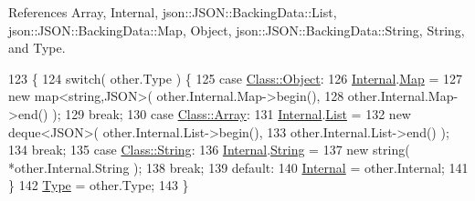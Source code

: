 References Array, Internal, json\+::\+J\+S\+O\+N\+::\+Backing\+Data\+::\+List, json\+::\+J\+S\+O\+N\+::\+Backing\+Data\+::\+Map, Object, json\+::\+J\+S\+O\+N\+::\+Backing\+Data\+::\+String, String, and Type.


\begin{DoxyCode}
123                                   \{
124             \textcolor{keywordflow}{switch}( other.Type ) \{
125             \textcolor{keywordflow}{case} \mbox{\hyperlink{classjson_1_1_j_s_o_n_a762f55df6d407c1af61607ed516ffe07a497031794414a552435f90151ac3b54b}{Class::Object}}:
126                 \mbox{\hyperlink{classjson_1_1_j_s_o_n_a1e2a064794c3d55c8bb8887fc5734947}{Internal}}.\mbox{\hyperlink{unionjson_1_1_j_s_o_n_1_1_backing_data_ab2e19b00745b37d2add157ff3a35c431}{Map}} = 
127                     \textcolor{keyword}{new} map<string,JSON>( other.Internal.Map->begin(),
128                                           other.Internal.Map->end() );
129                 \textcolor{keywordflow}{break};
130             \textcolor{keywordflow}{case} \mbox{\hyperlink{classjson_1_1_j_s_o_n_a762f55df6d407c1af61607ed516ffe07a4410ec34d9e6c1a68100ca0ce033fb17}{Class::Array}}:
131                 \mbox{\hyperlink{classjson_1_1_j_s_o_n_a1e2a064794c3d55c8bb8887fc5734947}{Internal}}.\mbox{\hyperlink{unionjson_1_1_j_s_o_n_1_1_backing_data_ab85f5e7ad21f9f7a5407ab73128a3ebc}{List}} = 
132                     \textcolor{keyword}{new} deque<JSON>( other.Internal.List->begin(),
133                                       other.Internal.List->end() );
134                 \textcolor{keywordflow}{break};
135             \textcolor{keywordflow}{case} \mbox{\hyperlink{classjson_1_1_j_s_o_n_a762f55df6d407c1af61607ed516ffe07a27118326006d3829667a400ad23d5d98}{Class::String}}:
136                 \mbox{\hyperlink{classjson_1_1_j_s_o_n_a1e2a064794c3d55c8bb8887fc5734947}{Internal}}.\mbox{\hyperlink{unionjson_1_1_j_s_o_n_1_1_backing_data_a883c18d113d2e55767a9530f06a9c772}{String}} = 
137                     \textcolor{keyword}{new} string( *other.Internal.String );
138                 \textcolor{keywordflow}{break};
139             \textcolor{keywordflow}{default}:
140                 \mbox{\hyperlink{classjson_1_1_j_s_o_n_a1e2a064794c3d55c8bb8887fc5734947}{Internal}} = other.Internal;
141             \}
142             \mbox{\hyperlink{classjson_1_1_j_s_o_n_a3fa6923afa41bdfe38077fbc0079aaf5}{Type}} = other.Type;
143         \}
\end{DoxyCode}
\mbox{\label{classjson_1_1_j_s_o_n_ae67662933b6cc74a8ee6354448874724}} 
